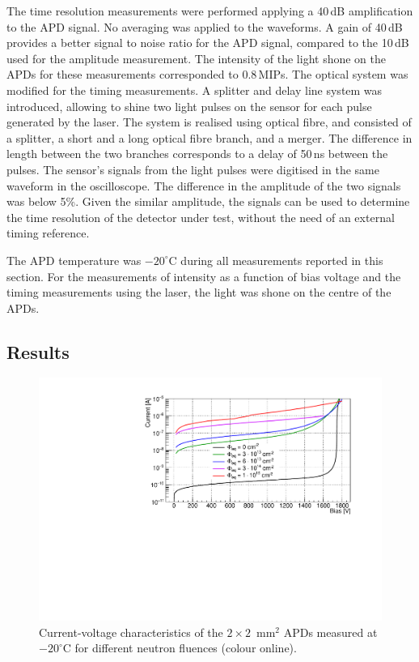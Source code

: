 \documentclass[review,number,sort&compress]{elsarticle}
\begin{document}
The time resolution measurements were performed applying a 40\,dB amplification to the APD signal.
No averaging was applied to the waveforms.
A gain of 40\,dB provides a better signal to noise ratio for the APD signal, compared to the 10\,dB used for the amplitude measurement.
The intensity of the light shone on the APDs for these measurements corresponded to 0.8\,MIPs.
The optical system was modified for the timing measurements.
A splitter and delay line system was introduced, allowing to shine two light pulses on the sensor for each pulse generated by the laser.
The system is realised using optical fibre, and consisted of a splitter, a short and a long optical fibre branch, and a merger.
The difference in length between the two branches corresponds to a delay of 50\,ns between the pulses.
The sensor's signals from the light pulses were digitised in the same waveform in the oscilloscope.
The difference in the amplitude of the two signals was below 5\%.
Given the similar amplitude, the signals can be used to determine the time resolution of the detector under test, without the need of an external timing reference.

The APD temperature was $-20^\circ$C during all measurements reported in this section.
For the measurements of intensity as a function of bias voltage and the timing measurements using the laser, the light was shone on the centre of the APDs.

\subsection{Results}

\begin{figure}
  \centering
  \includegraphics[width = 0.6 \columnwidth]{IVnIrrad}
  \caption{Current-voltage characteristics of the $2 \times 2$~mm$^2$ APDs measured at $-20^\circ$C for different neutron fluences (colour online).}
  \label{fig:iv2x2}
\end{figure}
\end{document}

